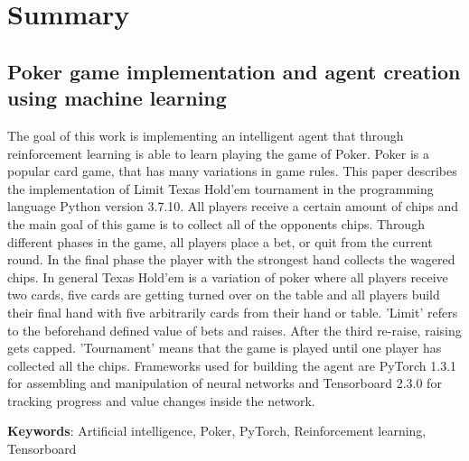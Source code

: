\section*{Summary}
\subsection*{Poker game implementation and agent creation using machine learning}

The goal of this work is implementing an intelligent agent that through reinforcement learning is able to learn playing the game of Poker. Poker is a popular card game, that has many variations in game rules. This paper describes the implementation of Limit Texas Hold'em tournament in the programming language Python version 3.7.10. All players receive a certain amount of chips and the main goal of this game is to collect all of the opponents chips. Through different phases in the game, all players place a bet, or quit from the current round. In the final phase the player with the strongest hand collects the wagered chips. In general Texas Hold'em is a variation of poker where all players receive two cards, five cards are getting turned over on the table and all players build their final hand with five arbitrarily cards from their hand or table. 'Limit' refers to the beforehand defined value of bets and raises. After the third re-raise, raising gets capped. 'Tournament' means that the game is played until one player has collected all the chips. Frameworks used for building the agent are PyTorch 1.3.1 for assembling and manipulation of neural networks and Tensorboard 2.3.0 for tracking progress and value changes inside the network.

\noindent
\textbf{Keywords}: Artificial intelligence, Poker, PyTorch, Reinforcement learning, Tensorboard